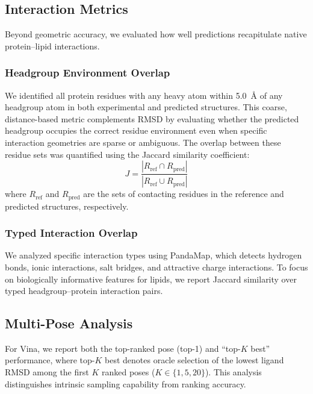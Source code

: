 \documentclass[journal=jcisd8,manuscript=article]{achemso}
\begin{document}
\subsection{Interaction Metrics}

Beyond geometric accuracy, we evaluated how well predictions recapitulate native protein--lipid interactions.

\subsubsection{Headgroup Environment Overlap}

We identified all protein residues with any heavy atom within \SI{5.0}{\angstrom} of any headgroup atom in both experimental and predicted structures.
This coarse, distance-based metric complements RMSD by evaluating whether the predicted headgroup occupies the correct residue environment even when specific interaction geometries are sparse or ambiguous.
The overlap between these residue sets was quantified using the Jaccard similarity coefficient:
\begin{equation}
    J = \frac{|R_\text{ref} \cap R_\text{pred}|}{|R_\text{ref} \cup R_\text{pred}|}
\end{equation}
where $R_\text{ref}$ and $R_\text{pred}$ are the sets of contacting residues in the reference and predicted structures, respectively.

\subsubsection{Typed Interaction Overlap}

We analyzed specific interaction types using PandaMap,\cite{pandamap} which detects hydrogen bonds, ionic interactions, salt bridges, and attractive charge interactions.
To focus on biologically informative features for lipids, we report Jaccard similarity over typed headgroup--protein interaction pairs.

\subsection{Multi-Pose Analysis}

For Vina, we report both the top-ranked pose (top-1) and ``top-$K$ best'' performance, where top-$K$ best denotes oracle selection of the lowest ligand RMSD among the first $K$ ranked poses ($K \in \{1,5,20\}$).
This analysis distinguishes intrinsic sampling capability from ranking accuracy.
\end{document}
